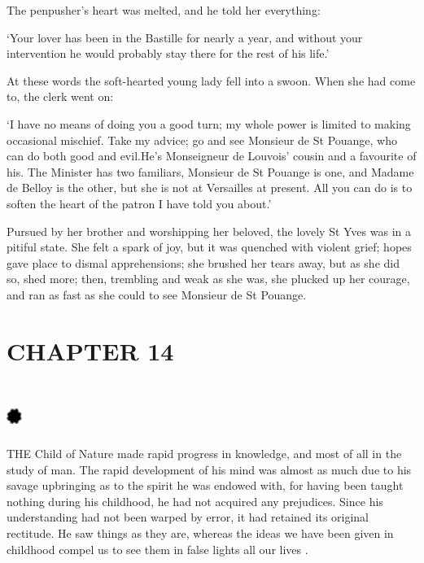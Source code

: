 \documentclass{article}
\begin{document}
\begin{center}
The penpusher's heart was melted, and he told her everything: 

`Your lover has been in the Bastille for nearly a year, and without your intervention 
he would probably stay there for the rest of his life.' 

At these words the soft-hearted young lady fell into a swoon. When she had come 
to, the clerk went on: 

`I have no means of doing you a good turn; my whole power is limited to making 
occasional mischief. Take my advice; go and see Monsieur de St Pouange, who can 
do both good and evil.He's Monseigneur de Louvois' cousin and a favourite of his. 
The Minister has two familiars, Monsieur de St Pouange is one, and Madame de Belloy 
is the other, but she is not at Versailles at present. All you can do is to soften 
the heart of the patron I have told you about.' 

Pursued by her brother and worshipping her beloved, the lovely St Yves was in a 
pitiful state. She felt a spark of joy, but it was quenched with violent grief; 
hopes gave place to dismal apprehensions; she brushed her tears away, but as she 
did so, shed more; then, trembling and weak as she was, she plucked up her courage, 
and ran as fast as she could to see Monsieur de St Pouange.\pagebreak{} 

\section*{\textbf{CHAPTER 14  }}

\section*{%
\includegraphics[width=14pt, height=15pt, keepaspectratio=true]{Zadig or L'Ingenu - Voltaire-fig036.jpg}
}

 

THE Child of Nature made rapid progress in knowledge, and most of all in the study 
of man. The rapid development of his mind was almost as much due to his savage 
upbringing as to the spirit he was endowed with, for having been taught nothing 
during his childhood, he had not acquired any prejudices. Since his understanding 
had not been warped by error, it had retained its original rectitude. He saw things 
as they are, whereas the ideas we have been given in childhood compel us to see 
them in false lights all our lives . 


\end{center}
\end{document}
